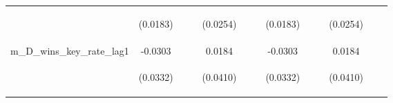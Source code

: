 \documentclass[]{article}
\begin{document}
\begin{center}
\begin{tabular}{lcccccccccccc}
\vspace{4pt} & \begin{footnotesize}(0.0183)\end{footnotesize} & \begin{footnotesize}\end{footnotesize} & \begin{footnotesize}\end{footnotesize} & \begin{footnotesize}(0.0254)\end{footnotesize} & \begin{footnotesize}\end{footnotesize} & \begin{footnotesize}\end{footnotesize} & \begin{footnotesize}(0.0183)\end{footnotesize} & \begin{footnotesize}\end{footnotesize} & \begin{footnotesize}\end{footnotesize} & \begin{footnotesize}(0.0254)\end{footnotesize} & \begin{footnotesize}\end{footnotesize} & \begin{footnotesize}\end{footnotesize} \\
m\_D\_wins\_key\_rate\_lag1 & -0.0303 &  &  & 0.0184 &  &  & -0.0303 &  &  & 0.0184 &  &  \\
\vspace{4pt} & \begin{footnotesize}(0.0332)\end{footnotesize} & \begin{footnotesize}\end{footnotesize} & \begin{footnotesize}\end{footnotesize} & \begin{footnotesize}(0.0410)\end{footnotesize} & \begin{footnotesize}\end{footnotesize} & \begin{footnotesize}\end{footnotesize} & \begin{footnotesize}(0.0332)\end{footnotesize} & \begin{footnotesize}\end{footnotesize} & \begin{footnotesize}\end{footnotesize} & \begin{footnotesize}(0.0410)\end{footnotesize} & \begin{footnotesize}\end{footnotesize} & \begin{footnotesize}\end{footnotesize} \\

\end{tabular}
\end{center}
\end{document}
